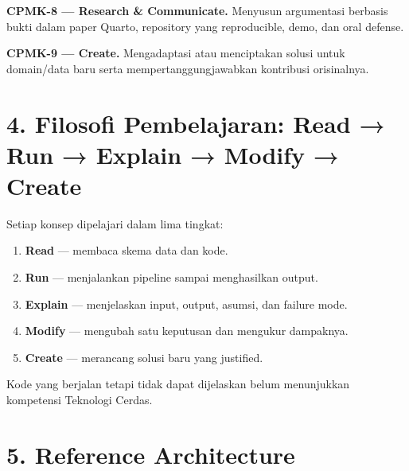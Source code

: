 \documentclass[
  indonesian,
  letterpaper,
  DIV=11,
  numbers=noendperiod]{scrreprt}
\providecommand{\tightlist}{%
  \setlength{\itemsep}{0pt}\setlength{\parskip}{0pt}}
\begin{document}
\textbf{CPMK-8 --- Research \& Communicate.} Menyusun argumentasi
berbasis bukti dalam paper Quarto, repository yang reproducible, demo,
dan oral defense.

\textbf{CPMK-9 --- Create.} Mengadaptasi atau menciptakan solusi untuk
domain/data baru serta mempertanggungjawabkan kontribusi orisinalnya.


\chapter{4. Filosofi Pembelajaran: Read → Run → Explain → Modify →
Create}\label{filosofi-pembelajaran-read-run-explain-modify-create}

Setiap konsep dipelajari dalam lima tingkat:

\begin{enumerate}
\def\labelenumi{\arabic{enumi}.}
\tightlist
\item
  \textbf{Read} --- membaca skema data dan kode.
\item
  \textbf{Run} --- menjalankan pipeline sampai menghasilkan output.
\item
  \textbf{Explain} --- menjelaskan input, output, asumsi, dan failure
  mode.
\item
  \textbf{Modify} --- mengubah satu keputusan dan mengukur dampaknya.
\item
  \textbf{Create} --- merancang solusi baru yang justified.
\end{enumerate}

Kode yang berjalan tetapi tidak dapat dijelaskan belum menunjukkan
kompetensi Teknologi Cerdas.


\chapter{5. Reference Architecture}\label{reference-architecture}
\end{document}
